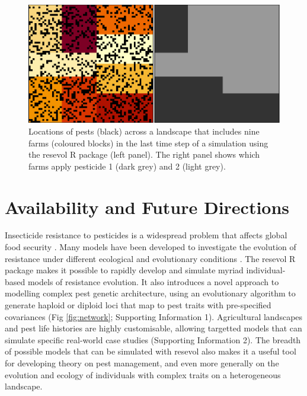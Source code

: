 \documentclass[
]{article}
\begin{document}
\begin{figure}
\centering
\includegraphics{ms_files/figure-latex/landscape-1.pdf}
\caption{\label{fig:landscape}Locations of pests (black) across a landscape that includes nine farms (coloured blocks) in the last time step of a simulation using the resevol R package (left panel). The right panel shows which farms apply pesticide 1 (dark grey) and 2 (light grey).}
\end{figure}

\hypertarget{conclusions}{%
\section{Availability and Future Directions}\label{conclusions}}

Insecticide resistance to pesticides is a widespread problem that affects global food security \citep{Tabashnik2014, Bradshaw2016, Lykogianni2021}.
Many models have been developed to investigate the evolution of resistance under different ecological and evolutionary conditions \citep[e.g.,][]{Curtis1985, Mani1985, Ives2002, Liang2013, Liang2018, Haridas2018, South2018, Sudo2018, Saikai2021}.
The resevol R package makes it possible to rapidly develop and simulate myriad individual-based models of resistance evolution.
It also introduces a novel approach to modelling complex pest genetic architecture, using an evolutionary algorithm to generate haploid or diploid loci that map to pest traits with pre-specified covariances (Fig \ref{fig:network}; Supporting Information 1).
Agricultural landscapes and pest life histories are highly customisable, allowing targetted models that can simulate specific real-world case studies (Supporting Information 2).
The breadth of possible models that can be simulated with resevol also makes it a useful tool for developing theory on pest management, and even more generally on the evolution and ecology of individuals with complex traits on a heterogeneous landscape.
\end{document}
